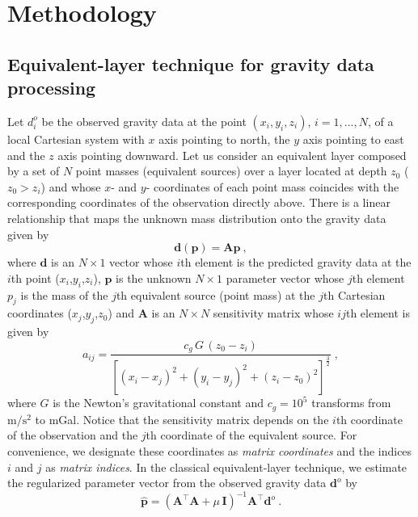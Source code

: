 \section{Methodology}

\subsection{Equivalent-layer technique for gravity data processing}

Let $d^{o}_{i}$ be the observed gravity data at
the point $(x_{i}, y_{i}, z_{i})$, $i = 1, ..., N$, of a local Cartesian
system with $x$ axis pointing to north, the $y$ axis pointing to east and 
the $z$ axis pointing downward.
Let us consider an equivalent layer composed by a set of $N$ point masses 
(equivalent sources) over a layer located at depth $z_0$ ($z_0 >z_i$) and whose 
$x$- and $y$- coordinates of each point mass coincides with the corresponding coordinates 
of the observation directly above.
There is a linear relationship that maps the unknown mass distribution onto the gravity 
data given by
\begin{equation}
\mathbf{d}(\mathbf{p}) = \mathbf{A} \mathbf{p} \: ,
\label{eq:predicted-data-vector}
\end{equation}
where $\mathbf{d}$ is an $N \times 1$ vector whose $i$th element is the predicted gravity 
data at the $i$th point ($x_i$,$y_i$,$z_i$), $\mathbf{p}$ is the unknown $N \times 1$ 
parameter vector whose $j$th element $p_j$  is the mass of the $j$th equivalent source 
(point mass) at the $j$th Cartesian coordinates ($x_j$,$y_j$,$z_0$) and $\mathbf{A}$ 
is an $N \times N$  sensitivity matrix whose $ij$th element is given by 
\begin{equation}
a_{ij}= \frac{c_{g} \, G \, (z_{0} - z_{i})}{\left[(x_{i} - x_{j})^{2} +
(y_{i} - y_{j})^{2} +	(z_{i} - z_{0})^{2} \right]^{\frac{3}{2}}} \; ,
\label{eq:aij}
\end{equation}
where $G$ is the Newton's gravitational constant and $c_{g} = 10^{5}$ 
transforms from $\mathrm{m/s^2}$ to mGal.
Notice that the sensitivity matrix depends on the $i$th coordinate of the observation 
and the $j$th coordinate of the equivalent source. For convenience, we designate 
these coordinates as \textit{matrix coordinates} and the indices $i$ and $j$ as 
\textit{matrix indices}.
In the classical equivalent-layer technique, we estimate the regularized parameter vector 
from the observed gravity data $\mathbf{d}^{o}$ by
\begin{equation}
\hat{\mathbf{p}} = \left( \mathbf{A}^{\top}\mathbf{A} + 
\mu \, \mathbf{I} \right)^{-1}
\mathbf{A}^{\top} \mathbf{d}^{o} \: .
\label{eq:estimated-p-parameter-space}
\end{equation}

